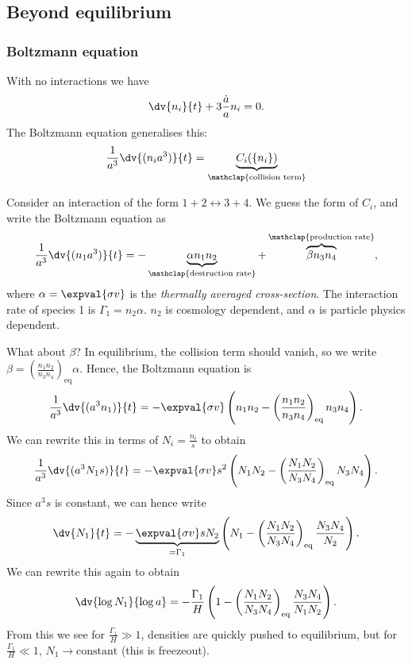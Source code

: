 \documentclass{jknotes}
\begin{document}
\subsection{Beyond equilibrium}
\subsubsection*{Boltzmann equation}
With no interactions we have
\begin{equation}
    \dv{n_i}{t} + 3\frac{\dot{a}}{a} n_i = 0.
\end{equation}
The Boltzmann equation generalises this:
\begin{equation}
    \frac1{a^3}\dv{(n_ia^3)}{t} = \underbrace{C_i(\{n_i\})}_{\mathclap{\text{collision term}}}
\end{equation}

Consider an interaction of the form \(1+2\leftrightarrow3+4\). We guess the form of \(C_i\), and write the Boltzmann equation as
\begin{equation}
    \frac1{a^3}\dv{(n_1a^3)}{t} = - \underbrace{\alpha n_1 n_2}_{\mathclap{\text{destruction rate}}} + \overbrace{\beta n_3 n_4}^{\mathclap{\text{production rate}}},
\end{equation}
where \(\alpha = \expval{\sigma v}\) is the \emph{thermally averaged cross-section}. The interaction rate of species 1 is \(\Gamma_1 = n_2\alpha\). \(n_2\) is cosmology dependent, and \(\alpha\) is particle physics dependent.

What about \(\beta\)? In equilibrium, the collision term should vanish, so we write \(\beta = \left(\frac{n_1n_2}{n_3n_4}\right)_{\text{eq}}\alpha\). Hence, the Boltzmann equation is
\begin{equation}
    \frac1{a^3}\dv{(a^3n_1)}{t} = - \expval{\sigma v}\left(n_1n_2 - \left(\frac{n_1n_2}{n_3n_4}\right)_{\text{eq}} n_3n_4\right).
\end{equation}
We can rewrite this in terms of \(N_i = \frac{n_i}{s}\) to obtain
\begin{equation}
    \frac1{a^3}\dv{(a^3N_1s)}{t} = - \expval{\sigma v}s^2\left(N_1N_2 - \left(\frac{N_1N_2}{N_3N_4}\right)_{\text{eq}} N_3N_4\right).
\end{equation}
Since \(a^3s\) is constant, we can hence write
\begin{equation}
    \dv{N_1}{t} = - \underbrace{\expval{\sigma v}sN_2}_{=\Gamma_1}\left(N_1 - \left(\frac{N_1N_2}{N_3N_4}\right)_{\text{eq}} \frac{N_3N_4}{N_2}\right).
\end{equation}
We can rewrite this again to obtain
\begin{equation}
    \dv{\log N_1}{\log a} = - \frac{\Gamma_1}{H}\left(1 - \left(\frac{N_1N_2}{N_3N_4}\right)_{\text{eq}}\frac{N_3N_4}{N_1N_2}\right).
\end{equation}
From this we see for \(\frac{\Gamma_1}{H}\gg1\), densities are quickly pushed to equilibrium, but for \(\frac{\Gamma_1}{H}\ll 1\), \(N_1 \to \text{constant}\) (this is freezeout).
\end{document}
